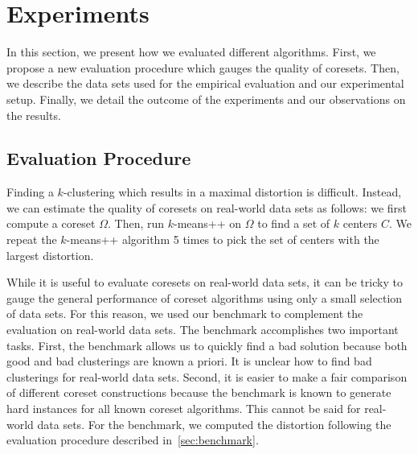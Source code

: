 


\section{Experiments} \label{sec:experiments}
In this section, we present how we evaluated different algorithms. First, we propose a new evaluation procedure which gauges the quality of coresets. Then, we describe the data sets used for the empirical evaluation and our experimental setup. Finally, we detail the outcome of the experiments and our observations on the results.

\subsection{Evaluation Procedure}
Finding a $k$-clustering which results in a maximal distortion is difficult. Instead, we can estimate the quality of coresets on real-world data sets as follows: we first compute a coreset $\Omega$. Then, run $k$-means++ on $\Omega$ to find a set of $k$ centers $C$. We repeat the $k$-means++ algorithm 5 times to pick the set of centers with the largest distortion.

While it is useful to evaluate coresets on real-world data sets, it can be tricky to gauge the general performance of coreset algorithms using only a small selection of data sets. For this reason, we used our benchmark to complement the evaluation on real-world data sets. The benchmark accomplishes two important tasks. First, the benchmark allows us to quickly find a bad solution because both good and bad clusterings are known a priori. It is unclear how to find bad clusterings for real-world data sets. Second, it is easier to make a fair comparison of different coreset constructions because the benchmark is known to generate hard instances for all known coreset algorithms. This cannot be said for real-world data sets. For the benchmark, we computed the distortion following the evaluation procedure described in~\cref{sec:benchmark}. 

